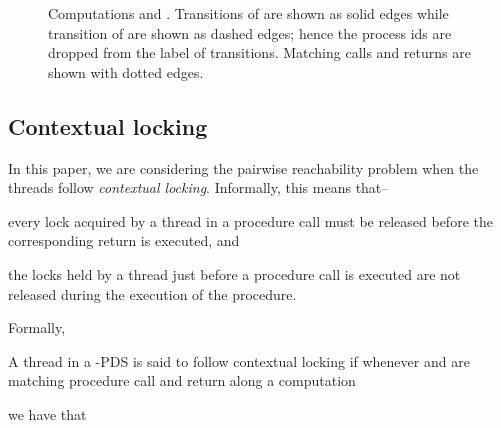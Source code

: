 \documentclass{LMCS}
\begin{document}
\begin{example}
\begin{figure}
\begin{center}
\end{center}
\caption{Computations  and . Transitions of  are
  shown as solid edges while transition of  are shown as dashed
  edges; hence the process ids are dropped from the label of
  transitions. Matching calls and returns are shown with dotted
  edges.}
\label{fig:compexam}
\end{figure}


\end{example}


\subsection{Contextual locking}
In this paper, we are considering the pairwise reachability problem when the threads follow  {\it contextual locking}. Informally, this means that--
\begin{iteMize}{}
\item every lock acquired by a thread in a
procedure call must be released before the corresponding return is executed, and
\item the locks held by a thread just before a procedure call is executed are not released during the
execution of the procedure.

\end{iteMize}
Formally,
 \begin{definition}
A thread  in a -PDS  is said to follow contextual locking if whenever 
and  are matching procedure call and return  along a computation

we have that


 \end{definition}
\end{document}
